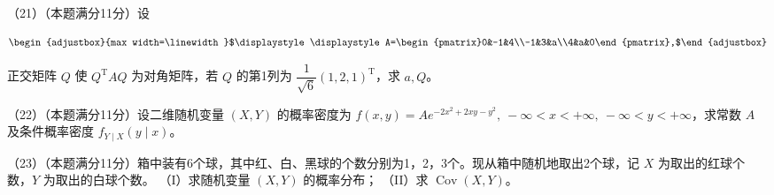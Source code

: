 \documentclass[UTF8,12pt]{ctexart}
\newcommand{\fitmath}[1]{\begin{adjustbox}{max width=\linewidth}$\displaystyle #1$\end{adjustbox}}
\begin{document}
（21）（本题满分11分）设


\[\fitmath{\displaystyle A=\begin{pmatrix}0&-1&4\\-1&3&a\\4&a&0\end{pmatrix},}\]


正交矩阵 \(\displaystyle Q\) 使 \(\displaystyle Q^{\mathrm T}AQ\) 为对角矩阵，若 \(\displaystyle Q\) 的第1列为 \(\displaystyle \dfrac{\displaystyle 1}{\displaystyle \sqrt6}(1,\allowbreak 2,\allowbreak 1)^{\mathrm T}\)，求 \(\displaystyle a,\allowbreak Q\)。


（22）（本题满分11分）设二维随机变量 \(\displaystyle (X,\allowbreak Y)\) 的概率密度为 \(\displaystyle f(x,\allowbreak y)=Ae^{-2x^2+2xy-y^2},\allowbreak \ -\infty<x<+\infty,\allowbreak \ -\infty<y<+\infty\)，求常数 \(\displaystyle A\) 及条件概率密度 \(\displaystyle f_{Y\mid X}(y\mid x)\)。


（23）（本题满分11分）箱中装有6个球，其中红、白、黑球的个数分别为1，2，3个。现从箱中随机地取出2个球，记 \(\displaystyle X\) 为取出的红球个数，\(\displaystyle Y\) 为取出的白球个数。
（I）求随机变量 \(\displaystyle (X,\allowbreak Y)\) 的概率分布；
（II）求 \(\displaystyle \operatorname{Cov}(X,\allowbreak Y)\)。


\clearpage
\end{document}

